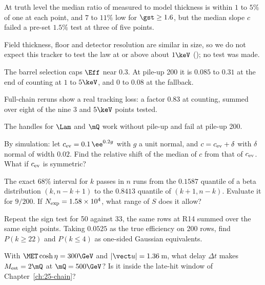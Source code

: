 \begin{chaptersummary}
  \item At truth level the median ratio of measured to model thickness is within $1$ to $5\%$ of one at each point, and $7$ to $11\%$ low for $\gst\ge1.6$, but the median slope $c$ failed a pre-set $1.5\%$ test at three of five points.
  \item Field thickness, floor and detector resolution are similar in size, so we do not expect this tracker to test the law at or above about $1\keV$ (\EST); no test was made.
  \item The barrel selection caps $\Eff$ near $0.3$. At pile-up 200 it is $0.085$ to $0.31$ at the end of counting at $1$ to $5\keV$, and $0$ to $0.08$ at the fallback.
  \item Full-chain reruns show a real tracking loss: a factor $0.83$ at counting, summed over eight of the nine $3$ and $5\keV$ points tested.
  \item The handles for $\Lam$ and $\mQ$ work without pile-up and fail at pile-up 200.
\end{chaptersummary}

\begin{exercises}
  \item\label{ex:26-median} By simulation: let $c_{\rm ev}=0.1\,\ee^{0.2g}$ with $g$ a unit normal, and $c=c_{\rm ev}+\delta$ with $\delta$ normal of width $0.02$. Find the relative shift of the median of $c$ from that of
  $c_{\rm ev}$. What if $c_{\rm ev}$ is symmetric?
  \item\label{ex:26-cp} The exact $68\%$ interval for $k$ passes in $n$ runs from the $0.1587$ quantile of a beta distribution $(k,n-k+1)$ to the $0.8413$ quantile of $(k+1,n-k)$. Evaluate it for $9/200$. If $N_{\rm exp}=1.58\times10^4$, what range of $S$ does it allow?
  \item\label{ex:26-tails} Repeat the sign test for 50 against 33, the same rows at R14 summed over the same eight points. Taking $0.0525$ as the true efficiency on 200 rows, find $P(k\ge22)$ and $P(k\le4)$ as one-sided Gaussian equivalents.
  \item\label{ex:26-tof} With $\MET\cosh\eta=300\GeV$ and $|\vect u|=1.36$\,m, what delay $\Delta t$ makes $M_{\rm est}=2\mQ$ at $\mQ=500\GeV$? Is it inside the late-hit window of Chapter~\ref{ch:25-chain}?
\end{exercises}
